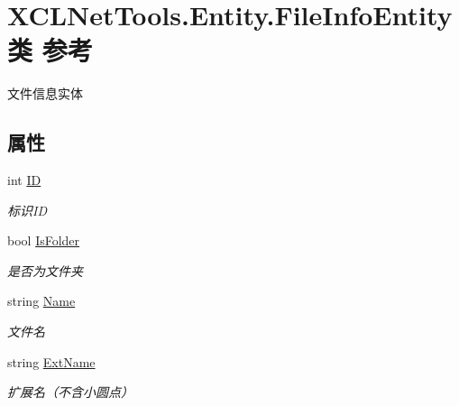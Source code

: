 \hypertarget{class_x_c_l_net_tools_1_1_entity_1_1_file_info_entity}{}\section{X\+C\+L\+Net\+Tools.\+Entity.\+File\+Info\+Entity类 参考}
\label{class_x_c_l_net_tools_1_1_entity_1_1_file_info_entity}


文件信息实体  


\subsection*{属性}
\begin{DoxyCompactItemize}
\item 
int \hyperlink{class_x_c_l_net_tools_1_1_entity_1_1_file_info_entity_a150f26081f12badeea9a2255bbea6faf}{ID}
\begin{DoxyCompactList}\small\item\em 标识\+ID \end{DoxyCompactList}\item 
bool \hyperlink{class_x_c_l_net_tools_1_1_entity_1_1_file_info_entity_ad945716535742c01f83dffc2766c0987}{Is\+Folder}
\begin{DoxyCompactList}\small\item\em 是否为文件夹 \end{DoxyCompactList}\item 
string \hyperlink{class_x_c_l_net_tools_1_1_entity_1_1_file_info_entity_a15a2bb6c738c32250f00604b6636cae4}{Name}
\begin{DoxyCompactList}\small\item\em 文件名 \end{DoxyCompactList}\item 
string \hyperlink{class_x_c_l_net_tools_1_1_entity_1_1_file_info_entity_a46ccaf5dbcc1154782c0227c83eb54e4}{Ext\+Name}
\begin{DoxyCompactList}\small\item\em 扩展名（不含小圆点） \end{DoxyCompactList}\item 

\end{DoxyCompactItemize}
